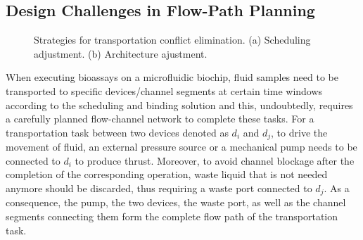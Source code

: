 \subsection{Design Challenges in Flow-Path Planning}\label{sec:flow_path_chan}

\begin{figure}[t]
    \centering
    \label{ta1}
    \label{tb1}
	  \caption{Strategies for transportation conflict elimination. (a) Scheduling adjustment. (b) Architecture ajustment.}
	  \label{fig:strategy}
\end{figure}

When executing bioassays on a microfluidic biochip, fluid samples need to be transported to specific devices/channel segments at certain time windows according to the scheduling and binding solution and this, undoubtedly, requires a carefully planned flow-channel network to complete these tasks. For a  transportation task between two devices denoted as $d_i$ and $d_j$, to drive the movement of fluid, an external pressure source or a mechanical pump needs to be connected to $d_i$ to produce thrust. Moreover, to avoid channel blockage after the completion of the corresponding operation, waste liquid that is not needed anymore should be discarded, thus requiring a waste port connected to $d_j$. As a consequence, the pump, the two devices, the waste port, as well as the channel segments connecting them form the complete flow path of the transportation task.

